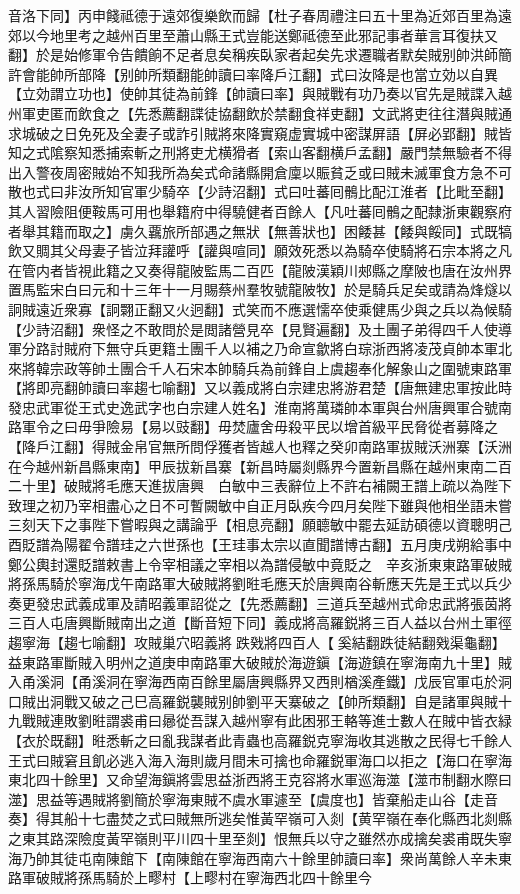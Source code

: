 音洛下同】丙申餞祗德于遠郊復樂飲而歸【杜子春周禮注曰五十里為近郊百里為遠郊以今地里考之越州百里至蕭山縣王式豈能送鄭祗德至此邪記事者華言耳復扶又翻】於是始修軍令告饋餉不足者息矣稱疾臥家者起矣先求遷職者默矣賊别帥洪師簡許會能帥所部降【别帥所類翻能帥讀曰率降戶江翻】式曰汝降是也當立効以自異【立効謂立功也】使帥其徒為前鋒【帥讀曰率】與賊戰有功乃奏以官先是賊諜入越州軍吏匿而飲食之【先悉薦翻諜徒協翻飲於禁翻食祥吏翻】文武將吏往往潛與賊通求城破之日免死及全妻子或詐引賊將來降實窺虚實城中密謀屏語【屏必郢翻】賊皆知之式隂察知悉捕索斬之刑將吏尤横猾者【索山客翻横戶孟翻】嚴門禁無驗者不得出入警夜周密賊始不知我所為矣式命諸縣開倉廩以賑貧乏或曰賊未滅軍食方急不可散也式曰非汝所知官軍少騎卒【少詩沼翻】式曰吐蕃囘鶻比配江淮者【比毗至翻】其人習險阻便鞍馬可用也舉籍府中得驍健者百餘人【凡吐蕃囘鶻之配隸浙東觀察府者舉其籍而取之】虜久覊旅所部遇之無狀【無善狀也】困餧甚【餧與餒同】式既犒飲又賙其父母妻子皆泣拜讙呼【讙與喧同】願效死悉以為騎卒使騎將石宗本將之凡在管内者皆視此籍之又奏得龍陂監馬二百匹【龍陂漢穎川郟縣之摩陂也唐在汝州界置馬監宋白曰元和十三年十一月賜蔡州羣牧號龍陂牧】於是騎兵足矣或請為烽燧以詗賊遠近衆寡【詗翾正翻又火迥翻】式笑而不應選懦卒使乘健馬少與之兵以為候騎【少詩沼翻】衆怪之不敢問於是閲諸營見卒【見賢遍翻】及土團子弟得四千人使導軍分路討賊府下無守兵更籍土團千人以補之乃命宣歙將白琮浙西將凌茂貞帥本軍北來將韓宗政等帥土團合千人石宋本帥騎兵為前鋒自上虞趨奉化解象山之圍號東路軍【將即亮翻帥讀曰率趨七喻翻】又以義成將白宗建忠將游君楚【唐無建忠軍按此時發忠武軍從王式史逸武字也白宗建人姓名】淮南將萬璘帥本軍與台州唐興軍合號南路軍令之曰毋爭險易【易以豉翻】毋焚廬舍毋殺平民以增首級平民脅從者募降之【降戶江翻】得賊金帛官無所問俘獲者皆越人也釋之癸卯南路軍拔賊沃洲寨【沃洲在今越州新昌縣東南】甲辰拔新昌寨【新昌時屬剡縣界今置新昌縣在越州東南二百二十里】破賊將毛應天進拔唐興　白敏中三表辭位上不許右補闕王譜上疏以為陛下致理之初乃宰相盡心之日不可暫闕敏中自正月臥疾今四月矣陛下雖與他相坐語未嘗三刻天下之事陛下嘗暇與之講論乎【相息亮翻】願聼敏中罷去延訪碩德以資聰明己酉貶譜為陽翟令譜珪之六世孫也【王珪事太宗以直聞譜博古翻】五月庚戌朔給事中鄭公輿封還貶譜敕書上令宰相議之宰相以為譜侵敏中竟貶之　辛亥浙東東路軍破賊將孫馬騎於寧海戊午南路軍大破賊將劉暀毛應天於唐興南谷斬應天先是王式以兵少奏更發忠武義成軍及請昭義軍詔從之【先悉薦翻】三道兵至越州式命忠武將張茵將三百人屯唐興斷賊南出之道【斷音短下同】義成將高羅鋭將三百人益以台州土軍徑趨寧海【趨七喻翻】攻賊巢穴昭義將跌戣將四百人【奚結翻跌徒結翻戣渠龜翻】益東路軍斷賊入明州之道庚申南路軍大破賊於海遊鎭【海遊鎮在寧海南九十里】賊入甬溪洞【甬溪洞在寧海西南百餘里屬唐興縣界又西則楢溪產鐵】戊辰官軍屯於洞口賊出洞戰又破之己巳高羅鋭襲賊别帥劉平天寨破之【帥所類翻】自是諸軍與賊十九戰賊連敗劉暀謂裘甫曰曏從吾謀入越州寧有此困邪王輅等進士數人在賊中皆衣緑【衣於既翻】暀悉斬之曰亂我謀者此青蟲也高羅鋭克寧海收其逃散之民得七千餘人王式曰賊窘且飢必逃入海入海則歲月間未可擒也命羅鋭軍海口以拒之【海口在寧海東北四十餘里】又命望海鎭將雲思益浙西將王克容將水軍巡海澨【澨市制翻水際曰澨】思益等遇賊將劉簡於寧海東賊不虞水軍遽至【虞度也】皆棄船走山谷【走音奏】得其船十七盡焚之式曰賊無所逃矣惟黃罕嶺可入剡【黄罕嶺在奉化縣西北剡縣之東其路深險度黃罕嶺則平川四十里至剡】恨無兵以守之雖然亦成擒矣裘甫既失寧海乃帥其徒屯南陳館下【南陳館在寧海西南六十餘里帥讀曰率】衆尚萬餘人辛未東路軍破賊將孫馬騎於上疁村【上疁村在寧海西北四十餘里今